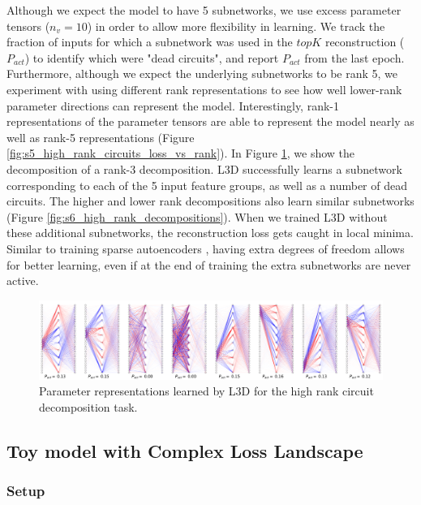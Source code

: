 \documentclass{article}
\theoremstyle{plain}
\theoremstyle{definition}
\theoremstyle{remark}
\begin{document}
Although we expect the model to have 5 subnetworks, we use excess parameter tensors ($n_v=10$) in order to allow more flexibility in learning. We track the fraction of inputs for which a subnetwork was used in the $topK$ reconstruction ($P_{act}$) to identify which were "dead circuits", and report $P_{act}$ from the last epoch. Furthermore, although we expect the underlying subnetworks to be rank 5, we experiment with using different rank representations to see how well lower-rank parameter directions can represent the model. Interestingly, rank-1 representations of the parameter tensors are able to represent the model nearly as well as rank-5 representations (Figure \ref{fig:s5_high_rank_circuits_loss_vs_rank}). In Figure \ref{fig:7_high_rank_decomposition}, we show the decomposition of a rank-3 decomposition. L3D successfully learns a subnetwork corresponding to each of the 5 input feature groups, as well as a number of dead circuits. The higher and lower rank decompositions also learn similar subnetworks (Figure \ref{fig:s6_high_rank_decompositions}). When we trained L3D without these additional subnetworks, the reconstruction loss gets caught in local minima. Similar to training sparse autoencoders \cite{cunningham2023sparse}, having extra degrees of freedom allows for better learning, even if at the end of training the extra subnetworks are never active.

\begin{figure}[htbp]
    \centerline{\includegraphics[width=\textwidth]{../figures/7_high_rank_decomposition.pdf}}
    \centering
    \caption{Parameter representations learned by L3D for the high rank circuit decomposition task.}\label{fig:7_high_rank_decomposition}
\end{figure}

\subsection{Toy model with Complex Loss Landscape}

\subsubsection{Setup}
\end{document}
